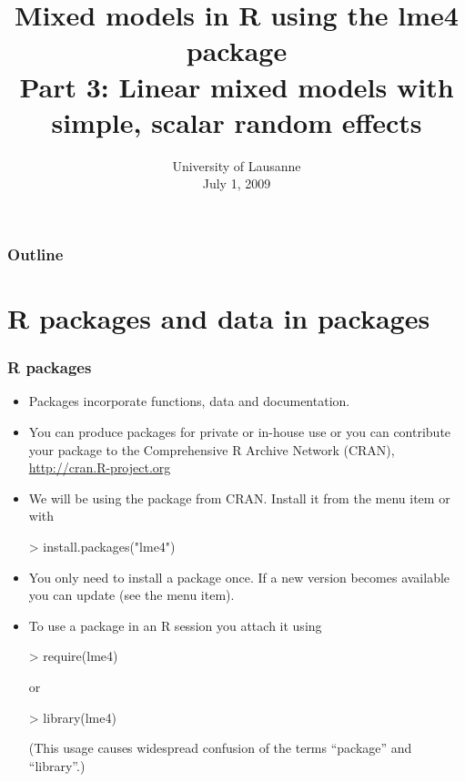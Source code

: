 
\usepackage{SweaveSlides}
\title[lme4]{Mixed models in R using the lme4 package\\Part 3: Linear mixed models with simple, scalar random effects}
\subject{LMM}
\date[July 1, 2009]{University of Lausanne\\July 1, 2009}

\frame{\titlepage}
\begin{frame}
  \frametitle{Outline}
\end{frame}




\section[Packages]{R packages and data in packages}

\begin{frame}[fragile]
  \frametitle{R packages}
  \begin{itemize}
  \item Packages incorporate functions, data and documentation.
  \item You can produce packages for private or in-house use or you
    can contribute your package to the Comprehensive R Archive Network
    (CRAN), \url{http://cran.R-project.org}
  \item We will be using the  package from CRAN.
    Install it from the  menu item or with
\begin{Schunk}
\begin{Sinput}
> install.packages("lme4")
\end{Sinput}
\end{Schunk}
\item You only need to install a package once.  If a new version
  becomes available you can update (see the menu item).
\item To use a package in an R session you attach it using
\begin{Schunk}
\begin{Sinput}
> require(lme4)
\end{Sinput}
\end{Schunk}
  or
\begin{Schunk}
\begin{Sinput}
> library(lme4)
\end{Sinput}
\end{Schunk}
  (This usage causes widespread confusion of the terms ``package'' and ``library''.)
  \end{itemize}
\end{frame}


